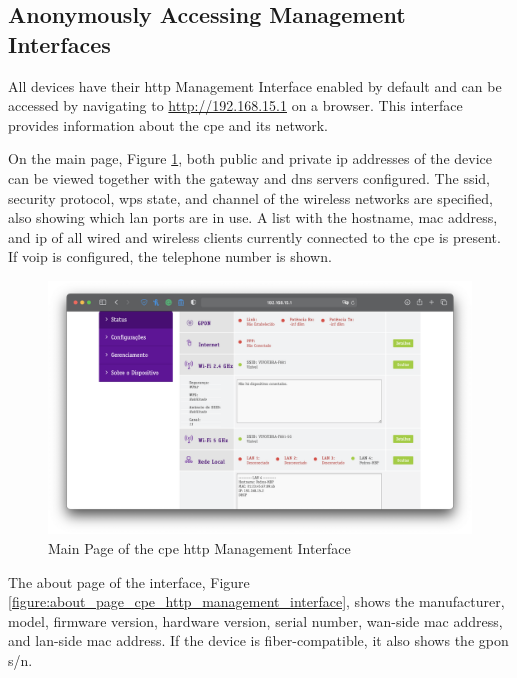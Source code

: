 \subsection{Anonymously Accessing Management Interfaces}

All devices have their \gls{http} Management Interface enabled by default and can be accessed by navigating to \url{http://192.168.15.1} on a browser. This interface provides information about the \gls{cpe} and its network.

On the main page, Figure \ref{figure:main_page_cpe_http_management_interface}, both public and private \gls{ip} addresses of the device can be viewed together with the gateway and \gls{dns} servers configured. The \gls{ssid}, security protocol, \gls{wps} state, and channel of the wireless networks are specified, also showing which \gls{lan} ports are in use. A list with the hostname, \gls{mac} address, and \gls{ip} of all wired and wireless clients currently connected to the \gls{cpe} is present. If \gls{voip} is configured, the telephone number is shown.

\begin{figure}[h]
    \centering
    \includegraphics[width=\linewidth]{contents/cpes-and-research-data/anonymously-accessing-management-interfaces/main-page-cpe-http-management-interface.png}
    \caption{Main Page of the \gls{cpe} \gls{http} Management Interface}
    \label{figure:main_page_cpe_http_management_interface}
\end{figure}

The about page of the interface, Figure \ref{figure:about_page_cpe_http_management_interface}, shows the manufacturer, model, firmware version, hardware version, serial number, \gls{wan}-side \gls{mac} address, and \gls{lan}-side \gls{mac} address. If the device is fiber-compatible, it also shows the \gls{gpon} \gls{s/n}.

